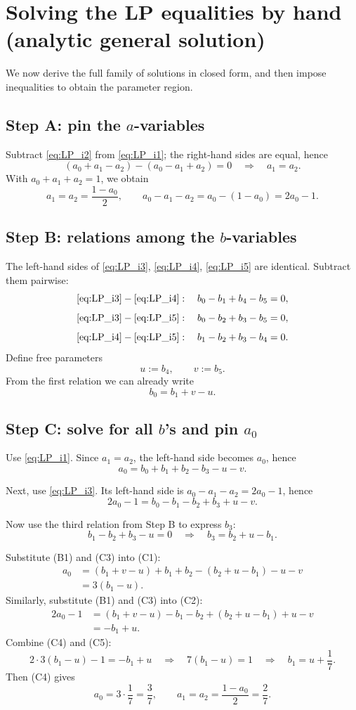 \documentclass[11pt]{article}
\begin{document}
\section{Solving the LP equalities by hand (analytic general solution)}

We now derive the full family of solutions in closed form, and then impose inequalities to obtain the parameter region.

\subsection{Step A: pin the $a$-variables}

Subtract \eqref{eq:LP_i2} from \eqref{eq:LP_i1}; the right-hand sides are equal, hence
\[
(a_0+a_1-a_2)-(a_0-a_1+a_2)=0 \quad\Longrightarrow\quad a_1=a_2.
\]
With $a_0+a_1+a_2=1$, we obtain
\[
a_1=a_2=\frac{1-a_0}{2},
\qquad
a_0-a_1-a_2=a_0-(1-a_0)=2a_0-1.
\]

\subsection{Step B: relations among the $b$-variables}

The left-hand sides of \eqref{eq:LP_i3}, \eqref{eq:LP_i4}, \eqref{eq:LP_i5} are identical. Subtract them pairwise:
\[
\eqref{eq:LP_i3}-\eqref{eq:LP_i4}:\quad b_0-b_1+b_4-b_5=0,
\]
\[
\eqref{eq:LP_i3}-\eqref{eq:LP_i5}:\quad b_0-b_2+b_3-b_5=0,
\]
\[
\eqref{eq:LP_i4}-\eqref{eq:LP_i5}:\quad b_1-b_2+b_3-b_4=0.
\]
Define free parameters
\[
u:=b_4,\qquad v:=b_5.
\]
From the first relation we can already write
\[
b_0=b_1+v-u. \tag{B1}
\]

\subsection{Step C: solve for all $b$'s and pin $a_0$}

Use \eqref{eq:LP_i1}. Since $a_1=a_2$, the left-hand side becomes $a_0$, hence
\[
a_0=b_0+b_1+b_2-b_3-u-v. \tag{C1}
\]

Next, use \eqref{eq:LP_i3}. Its left-hand side is $a_0-a_1-a_2=2a_0-1$, hence
\[
2a_0-1=b_0-b_1-b_2+b_3+u-v. \tag{C2}
\]

Now use the third relation from Step B to express $b_3$:
\[
b_1-b_2+b_3-u=0\quad\Longrightarrow\quad b_3=b_2+u-b_1. \tag{C3}
\]

Substitute (B1) and (C3) into (C1):
\[
\begin{aligned}
a_0
&=(b_1+v-u)+b_1+b_2-(b_2+u-b_1)-u-v\\
&=3(b_1-u). \tag{C4}
\end{aligned}
\]
Similarly, substitute (B1) and (C3) into (C2):
\[
\begin{aligned}
2a_0-1
&=(b_1+v-u)-b_1-b_2+(b_2+u-b_1)+u-v\\
&=-b_1+u. \tag{C5}
\end{aligned}
\]
Combine (C4) and (C5):
\[
2\cdot 3(b_1-u)-1=-b_1+u
\quad\Longrightarrow\quad
7(b_1-u)=1
\quad\Longrightarrow\quad
b_1=u+\frac{1}{7}. \tag{C6}
\]
Then (C4) gives
\[
a_0=3\cdot\frac{1}{7}=\frac{3}{7},
\qquad
a_1=a_2=\frac{1-a_0}{2}=\frac{2}{7}. \tag{C7}
\]
\end{document}
